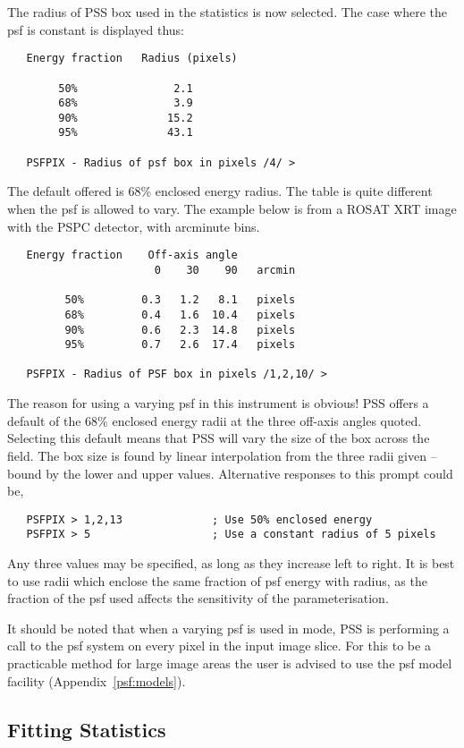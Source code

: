 The radius of PSS box used in the statistics is now selected. The
case where the psf is constant is displayed thus:
\begin{verbatim}
   Energy fraction   Radius (pixels)

        50%               2.1
        68%               3.9
        90%              15.2
        95%              43.1

   PSFPIX - Radius of psf box in pixels /4/ > 
\end{verbatim}
The default offered is 68\% enclosed energy radius. The table is quite
different when the psf is allowed to vary. The example below is from a
ROSAT XRT image with the PSPC detector, with arcminute bins.
\begin{verbatim}
   Energy fraction    Off-axis angle
                       0    30    90   arcmin

         50%         0.3   1.2   8.1   pixels
         68%         0.4   1.6  10.4   pixels
         90%         0.6   2.3  14.8   pixels
         95%         0.7   2.6  17.4   pixels

   PSFPIX - Radius of PSF box in pixels /1,2,10/ >
\end{verbatim}
The reason for using a varying psf in this instrument is obvious! PSS
offers a default of the 68\% enclosed energy radii at the three off-axis
angles quoted. Selecting this default means that PSS will vary the size
of the box across the field. The box size is found by linear interpolation
from the three radii given -- bound by the lower and upper values.
Alternative responses to this prompt could be,
\begin{verbatim}
   PSFPIX > 1,2,13              ; Use 50% enclosed energy
   PSFPIX > 5                   ; Use a constant radius of 5 pixels
\end{verbatim}
Any three values may be specified, as long as they increase left to right.
It is best to use radii which enclose the same fraction of psf energy
with radius, as the fraction of the psf used affects the sensitivity of
the parameterisation.

It should be noted that when a varying psf is used in  mode,
PSS is performing a call to the psf system on every pixel in the input 
image slice. For this to be a practicable method for large image areas
the user is advised to use the psf model facility (Appendix~\ref{psf:models}).

\subsection{Fitting Statistics}

